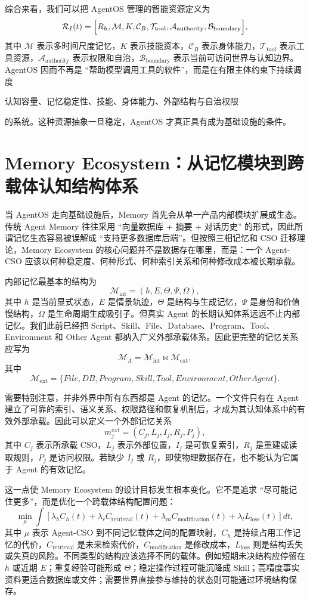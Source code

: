 综合来看，我们可以把 AgentOS 管理的智能资源定义为
\[
\mathcal R_I(t)
=
\Bigl[
R_h,
\mathcal M,
K,
\mathcal C_B,
\mathcal T_{\mathrm{tool}},
\mathcal A_{\mathrm{authority}},
\mathcal B_{\mathrm{boundary}}
\Bigr],
\]
其中 $\mathcal M$ 表示多时间尺度记忆，$K$ 表示技能资本，$\mathcal C_B$ 表示身体能力，$\mathcal T_{\mathrm{tool}}$ 表示工具资源，$\mathcal A_{\mathrm{authority}}$ 表示权限和自治，$\mathcal B_{\mathrm{boundary}}$ 表示当前可访问世界与认知边界。AgentOS 因而不再是 ``帮助模型调用工具的软件''，而是在有限主体约束下持续调度
\begin{remark}
认知容量、记忆稳定性、技能、身体能力、外部结构与自治权限
\end{remark}
的系统。这种资源抽象一旦稳定，AgentOS 才真正具有成为基础设施的条件。

\section{Memory Ecosystem：从记忆模块到跨载体认知结构体系}

当 AgentOS 走向基础设施后，Memory 首先会从单一产品内部模块扩展成生态。传统 Agent Memory 往往采用 ``向量数据库 + 摘要 + 对话历史'' 的形式，因此所谓记忆生态容易被误解成 ``支持更多数据库后端''。但按照三相记忆和 CSO 迁移理论，Memory Ecosystem 的核心问题并不是数据存在哪里，而是：一个 Agent-CSO 应该以何种稳定度、何种形式、何种索引关系和何种修改成本被长期承载。

内部记忆最基本的结构为
\[
\mathcal M_{\mathrm{int}}
=
(h,E,\Theta,\Psi,\Omega),
\]
其中 $h$ 是当前显式状态，$E$ 是情景轨迹，$\Theta$ 是结构与生成记忆，$\Psi$ 是身份和价值慢结构，$\Omega$ 是生命周期生成吸引子。但真实 Agent 的长期认知体系远远不止内部记忆。我们此前已经把 Script、Skill、File、Database、Program、Tool、Environment 和 Other Agent 都纳入广义外部承载体系。因此更完整的记忆关系应写为
\[
\mathcal M_A
=
\mathcal M_{\mathrm{int}}
\bowtie
\mathcal M_{\mathrm{ext}},
\]
其中
\[
\mathcal M_{\mathrm{ext}}
=
\{
File,DB,Program,Skill,Tool,Environment,OtherAgent
\}.
\]

需要特别注意，并非外界中所有东西都是 Agent 的记忆。一个文件只有在 Agent 建立了可靠的索引、语义关系、权限路径和恢复机制后，才成为其认知体系中的有效外部承载。因此可以定义一个外部记忆关系
\[
m_j^{ext}
=
(C_j,L_j,I_j,R_j,P_j),
\]
其中 $C_j$ 表示所承载 CSO，$L_j$ 表示外部位置，$I_j$ 是可恢复索引，$R_j$ 是重建或读取规则，$P_j$ 是访问权限。若缺少 $I_j$ 或 $R_j$，即使物理数据存在，也不能认为它属于 Agent 的有效记忆。

这一点使 Memory Ecosystem 的设计目标发生根本变化。它不是追求 ``尽可能记住更多''，而是优化一个跨载体结构配置问题：
\[
\min_{\mu}
\int
\left[
\lambda_h C_h(t)
+
\lambda_r C_{\mathrm{retrieval}}(t)
+
\lambda_m C_{\mathrm{modification}}(t)
+
\lambda_l L_{\mathrm{loss}}(t)
\right]dt,
\]
其中 $\mu$ 表示 Agent-CSO 到不同记忆载体之间的配置映射，$C_h$ 是持续占用工作记忆的代价，$C_{\mathrm{retrieval}}$ 是未来检索代价，$C_{\mathrm{modification}}$ 是修改成本，$L_{\mathrm{loss}}$ 则是结构丢失或失真的风险。不同类型的结构应该选择不同的载体。例如短期未决结构应停留在 $h$ 或近期 $E$；重复经验可能形成 $\Theta$；稳定操作过程可能沉降成 Skill；高精度事实资料更适合数据库或文件；需要世界直接参与维持的状态则可能通过环境结构保存。

